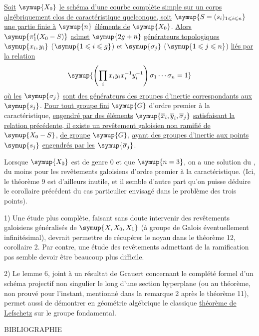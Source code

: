  \uline{Soit} $\symup{X_0}$ \uline{le schéma d'une courbe complète simple sur un
corps algébriquement clos de caractéristique quelconque, soit}
$\symup{S=(s_i)_{1\leqslant i\leqslant n}}$ \uline{une partie finie à} $\symup{n}$ \uline{éléments de} $\symup{X_0}$. \uline{Alors}
$\symup{\pi_1^t(X_0-S)}$ \uline{admet} $\symup{2g+n}$ \uline{générateurs topologiques}
$\symup{x_i,y_i}$ ($\symup{1\leqslant i\leqslant g}$) et $\symup{\sigma_j}$ ($\symup{1\leqslant j\leqslant n}$) \uline{liés par la relation}
\[
  \symup{\left(\prod_i x_i y_i x_i^{-1}y_i^{-1}\right)
  \sigma_1\cdots\sigma_n=1}
\]
\uline{où les} $\symup{\sigma_j}$ \uline{sont des générateurs des groupes d'inertie correspondants
aux} $\symup{s_j}$. \uline{Pour tout groupe fini} $\symup{G}$ d'ordre premier à la caractéristique,
\uline{engendré par des éléments} $\symup{\overline x_i,\overline y_i,\overline\sigma_j}$ \uline{satisfaisant la relation
précédente, il existe un revêtement galoisien non ramifié de} $\symup{X_0-S}$, \uline{de groupe}
$\symup{G}$, \uline{ayant des groupes d'inertie aux points} $\symup{s_j}$ \uline{engendrés par les}
$\symup{\overline\sigma_j}$.

Lorsque $\symup{X_0}$ est de genre 0 et que $\symup{n=3}$, on a une solution du , du moins pour les revêtements galoisiens d'ordre premier à
la caractéristique. (Ici, le théorème 9 est d'ailleurs inutile, et il semble
d'autre part qu'on puisse déduire le corollaire précédent du cas particulier
envisagé dans le problème des trois points).


1) Une étude plus complète, faisant sans doute intervenir des revêtements
galoisiens généralisés de $\symup{X,X_0,X_1}$ (à groupe de Galois éventuellement
infinitésimal), devrait permettre de récupérer le noyau dans le théorème 12,
corollaire 2. Par contre, une étude des revêtements admettant de la ramification
pas  semble devoir être beaucoup plus difficile.

2) Le lemme 6, joint à un résultat de Grauert concernant le complété formel
d'un schéma projectif non singulier le long d'une section hyperplane (ou au
théorème, non prouvé pour l'instant, mentionné dans la remarque 2 après le
théorème 11), permet aussi de démontrer en géométrie algébrique  le
classique \uline{théorème de Lefschetz} sur le groupe fondamental.

\begin{center}
  BIBLIOGRAPHIE
\end{center}

